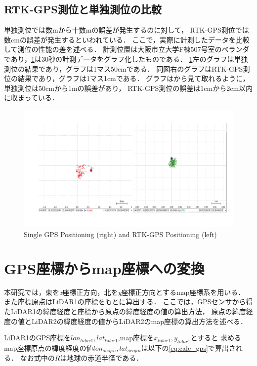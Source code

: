 \documentclass[autodetect-engine,dvipdfmx-if-dvi,ja=standard,a4j,jbase=11pt,magstyle=nomag*]{bxjsreport}
\begin{document}
\subsection{RTK-GPS測位と単独測位の比較}
単独測位では数mから十数mの誤差が発生するのに対して，
RTK-GPS測位では数cmの誤差が発生するといわれている．
ここで，実際に計測したデータを比較して測位の性能の差を述べる．
計測位置は大阪市立大学F棟507号室のベランダであり，\cref{fig:data_of_RTK}は30秒の計測データをグラフ化したものである．
\cref{fig:data_of_RTK}左のグラフは単独測位の結果であり，グラフは1マス50cmである．
同図右のグラフはRTK-GPS測位の結果であり，グラフは1マス1cmである．
グラフはから見て取れるように，単独測位は50cmから1mの誤差があり，
RTK-GPS測位の誤差は1cmから2cm以内に収まっている．

\begin{figure}[t]
    \centering
    \includegraphics[width=\linewidth, clip]{./figure/chapter3/Data_of_GPS_positioning.png}
    \caption{Single GPS Positioning (right) and RTK-GPS Positioning (left)}
    \label{fig:data_of_RTK}
\end{figure}

\section{GPS座標からmap座標への変換}
本研究では，東を{\it x}座標正方向，北を{\it y}座標正方向とするmap座標系を用いる．
また座標原点はLiDAR1の座標をもとに算出する．
ここでは，GPSセンサから得たLiDAR1の緯度経度と座標から原点の緯度経度の値の算出方法，
原点の緯度経度の値とLiDAR2の緯度経度の値からLiDAR2のmap座標の算出方法を述べる．

LiDAR1のGPS座標を$lon_{lidar1}, lat_{lidar1}$,map座標を$x_{lidar1}, y_{lidar1}$とすると
求めるmap座標原点の緯度経度の値$lon_{origin}, lat_{origin}$は以下の\cref{eq:calc_gps}で算出される．
なお式中の$R$は地球の赤道半径である．
\end{document}
